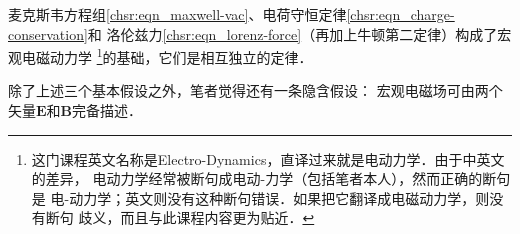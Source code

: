 麦克斯韦方程组\eqref{chsr:eqn_maxwell-vac}、电荷守恒定律\eqref{chsr:eqn_charge-conservation}和
洛伦兹力\eqref{chsr:eqn_lorenz-force}（再加上牛顿第二定律）构成了宏观电磁动力学
{\footnote{这门课程英文名称是Electro-Dynamics，直译过来就是{\fangsong 电动力学}．由于中英文的差异，
		{\kaishu 电动力学}经常被断句成{\kaishu 电动-力学}（包括笔者本人），然而正确的断句是
		{\kaishu 电-动力学}；英文则没有这种断句错误．如果把它翻译成{\heiti 电磁动力学}，则没有断句
		歧义，而且与此课程内容更为贴近．}}的基础，它们是相互独立的定律．

除了上述三个基本假设之外，笔者觉得还有一条隐含假设：
宏观电磁场可由两个矢量$\boldsymbol{E}$和$\boldsymbol{B}$完备描述．

